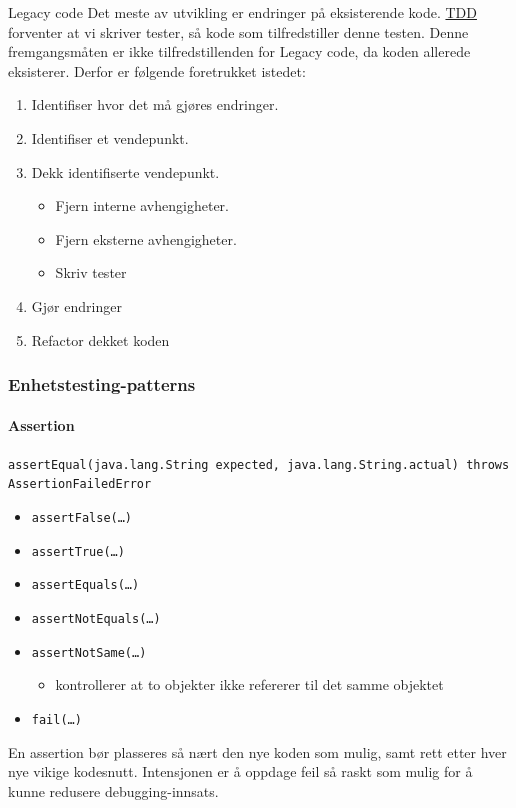 Legacy code Det meste av utvikling er endringer på eksisterende kode.
\href{\#Testdrevet-utvikling}{TDD} forventer at vi skriver tester, så
kode som tilfredstiller denne testen. Denne fremgangsmåten er ikke
tilfredstillenden for Legacy code, da koden allerede eksisterer. Derfor
er følgende foretrukket istedet:

\begin{enumerate}[1.]
\item
  Identifiser hvor det må gjøres endringer.
\item
  Identifiser et vendepunkt.
\item
  Dekk identifiserte vendepunkt.
  \begin{itemize}
  \item
    Fjern interne avhengigheter.
  \item
    Fjern eksterne avhengigheter.
  \item
    Skriv tester
  \end{itemize}
\item
  Gjør endringer
\item
  Refactor dekket koden
\end{enumerate}
\subsubsection{Enhetstesting-patterns}

\paragraph{Assertion}

\texttt{assertEqual(java.lang.String expected, java.lang.String.actual) throws AssertionFailedError}

\begin{itemize}
\item
  \texttt{assertFalse(\ldots{})}
\item
  \texttt{assertTrue(\ldots{})}
\item
  \texttt{assertEquals(\ldots{})}
\item
  \texttt{assertNotEquals(\ldots{})}
\item
  \texttt{assertNotSame(\ldots{})}
  \begin{itemize}
  \item
    kontrollerer at to objekter ikke refererer til det samme objektet
  \end{itemize}
\item
  \texttt{fail(\ldots{})}
\end{itemize}
En assertion bør plasseres så nært den nye koden som mulig, samt rett
etter hver nye vikige kodesnutt. Intensjonen er å oppdage feil så raskt
som mulig for å kunne redusere debugging-innsats.

